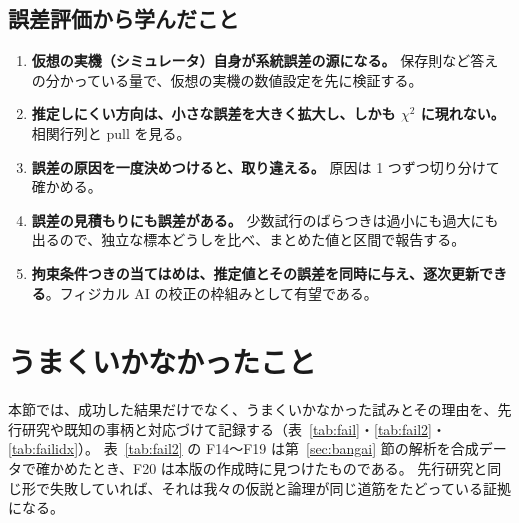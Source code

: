 \documentclass[paper=a4paper,fontsize=10pt,twocolumn,column_gap=2zw,line_length=24zw,number_of_lines=46,head_space=20mm]{jlreq}
\begin{document}
\subsection{誤差評価から学んだこと}
\begin{enumerate}\setlength{\itemsep}{0pt}
\item \textbf{仮想の実機（シミュレータ）自身が系統誤差の源になる。} 保存則など答えの分かっている量で、仮想の実機の数値設定を先に検証する。
\item \textbf{推定しにくい方向は、小さな誤差を大きく拡大し、しかも $\chi^2$ に現れない。} 相関行列と pull を見る。
\item \textbf{誤差の原因を一度決めつけると、取り違える。} 原因は 1 つずつ切り分けて確かめる。
\item \textbf{誤差の見積もりにも誤差がある。} 少数試行のばらつきは過小にも過大にも出るので、独立な標本どうしを比べ、まとめた値と区間で報告する。
\item \textbf{拘束条件つきの当てはめは、推定値とその誤差を同時に与え、逐次更新できる}。フィジカル AI の校正の枠組みとして有望である。
\end{enumerate}


\section{うまくいかなかったこと}\label{sec:fail}

本節では、成功した結果だけでなく、うまくいかなかった試みとその理由を、先行研究や既知の事柄と対応づけて記録する（表~\ref{tab:fail}・\ref{tab:fail2}・\ref{tab:failidx}）。
表~\ref{tab:fail2} の F14〜F19 は第~\ref{sec:bangai} 節の解析を合成データで確かめたとき、F20 は本版の作成時に見つけたものである。
先行研究と同じ形で失敗していれば、それは我々の仮説と論理が同じ道筋をたどっている証拠になる。
\end{document}
